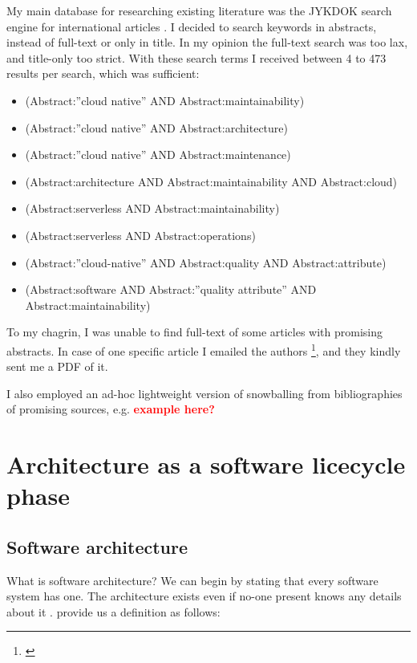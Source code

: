 \documentclass[utf8,english]{gradu3}
\newcommand{\todo}[1]{\textbf{\textcolor{red}{#1}}}
\begin{document}
My main database for researching existing literature was the JYKDOK search engine for international articles \parencite{JYKDOK}.
I decided to search keywords in abstracts, instead of full-text or only in title.
In my opinion the full-text search was too lax, and title-only too strict.
With these search terms I received between 4 to 473 results per search, which was sufficient:
\begin{itemize}
  \item (Abstract:''cloud native'' AND Abstract:maintainability)
  \item (Abstract:''cloud native'' AND Abstract:architecture)
  \item (Abstract:''cloud native'' AND Abstract:maintenance)
  \item (Abstract:architecture AND Abstract:maintainability AND Abstract:cloud)
  \item (Abstract:serverless AND Abstract:maintainability)
  \item (Abstract:serverless AND Abstract:operations)
  \item (Abstract:''cloud-native'' AND Abstract:quality AND Abstract:attribute)
  \item (Abstract:software AND Abstract:''quality attribute'' AND Abstract:maintainability)
\end{itemize}

To my chagrin, I was unable to find full-text of some articles with promising abstracts.
In case of one specific article I emailed the authors \footnote{\textcite{Bogner2018}}, and they kindly sent me a PDF of it.

I also employed an ad-hoc lightweight version of snowballing from bibliographies of
promising sources, e.g. \todo{example here?}

\section{Architecture as a software licecycle phase}

\subsection{Software architecture}

What is software architecture? We can begin by stating that every software
system has one. The architecture exists even if no-one present knows any details
about it \parencite[24]{Bass1998}. \textcite[23]{Bass1998} provide us a
definition as follows:
\end{document}
